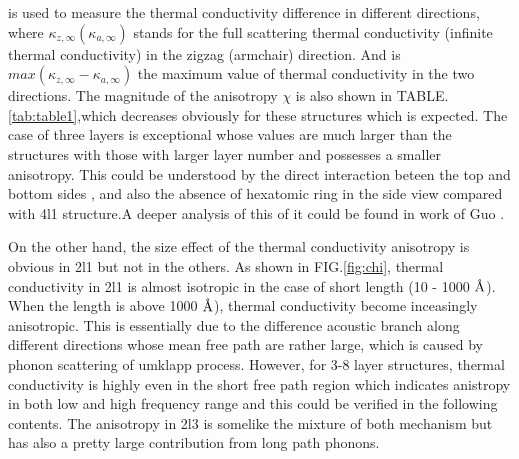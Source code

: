 \documentclass[%
 reprint,
 amsmath,amssymb,
 aps,
 prb,
]{revtex4-1}
\newcommand{\angstrom}{\mbox{\normalfont\AA}}
\begin{document}
is used to measure the thermal conductivity difference in different directions, where $ \kappa_{z,\infty} (\kappa_{a,\infty})$ stands for the full scattering thermal conductivity (infinite thermal conductivity) in the zigzag (armchair) direction. And is $ max⁡(\kappa_{z,\infty}-\kappa_{a,\infty} ) $ the maximum value of thermal conductivity in the two directions. The magnitude of the anisotropy $\chi$ is also shown in TABLE.\ref{tab:table1},which  decreases obviously for these structures which is expected. The case of three layers is exceptional whose values are much larger than the structures with those with larger layer number and possesses a smaller anisotropy. This could be understood by the direct interaction beteen the top and bottom sides , and also the absence of hexatomic ring in the side view compared with 4l1 structure.A deeper analysis of this of it could be found in work of Guo \cite{Guo2015Structural}.


On the other hand, the size effect of the thermal conductivity anisotropy is obvious in 2l1 but not in the others. As shown in FIG.\ref{fig:chi}, thermal conductivity in 2l1 is almost isotropic  in the case of short length (10 - 1000 $\angstrom$). When the length is above 1000  $\angstrom$), thermal conductivity become inceasingly anisotropic. This is essentially due to the difference acoustic branch along different directions whose mean free path are rather large, which is caused by phonon scattering of umklapp process. However, for 3-8 layer structures, thermal conductivity is highly even in the short free path region which indicates anistropy in both low and high frequency range and this could  be verified in the following contents. The anisotropy in 2l3 is somelike the mixture of both mechanism but has also a pretty large contribution from long path phonons.
\end{document}
